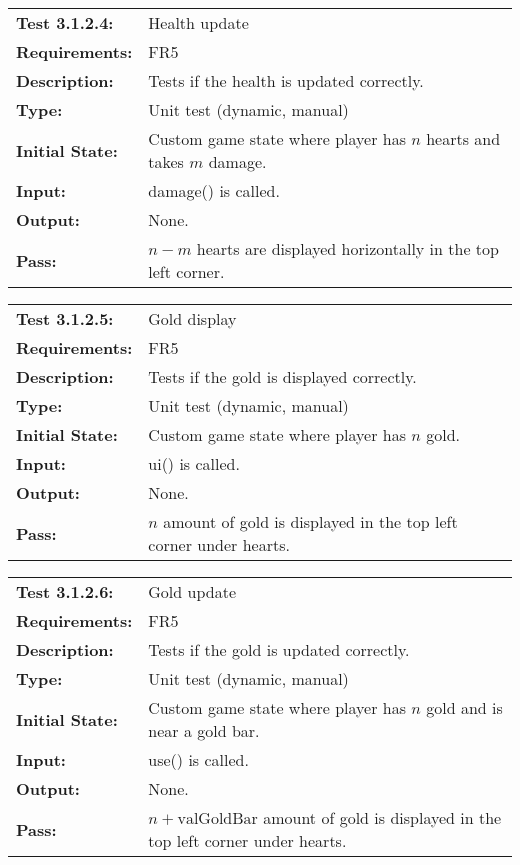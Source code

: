 \documentclass[12pt, titlepage]{article}
\begin{document}
\begin{tabular}{|l|p{10cm}|}
    \hline
    \bf{Test} 3.1.2.4: & Health update \\
    \bf{Requirements}: & FR5 \\
    \bf{Description}: & Tests if the health is updated correctly. \\
    \bf{Type}: & Unit test (dynamic, manual) \\
    \bf{Initial State}: & Custom game state where player has $n$ hearts and takes $m$ damage. \\
    \bf{Input}: & damage() is called. \\
    \bf{Output}: & None. \\
    \bf{Pass}: & $n - m$ hearts are displayed horizontally in the top left corner. \\
    \hline
\end{tabular}

\begin{tabular}{|l|p{10cm}|}
    \hline
    \bf{Test} 3.1.2.5: & Gold display \\
    \bf{Requirements}: & FR5 \\
    \bf{Description}: & Tests if the gold is displayed correctly. \\
    \bf{Type}: & Unit test (dynamic, manual) \\
    \bf{Initial State}: & Custom game state where player has $n$ gold. \\
    \bf{Input}: & ui() is called. \\
    \bf{Output}: & None. \\
    \bf{Pass}: & $n$ amount of gold is displayed in the top left corner under hearts. \\
    \hline
\end{tabular}

\begin{tabular}{|l|p{10cm}|}
    \hline
    \bf{Test} 3.1.2.6: & Gold update \\
    \bf{Requirements}: & FR5 \\
    \bf{Description}: & Tests if the gold is updated correctly. \\
    \bf{Type}: & Unit test (dynamic, manual) \\
    \bf{Initial State}: & Custom game state where player has $n$ gold and is near a gold bar. \\
    \bf{Input}: & use() is called. \\
    \bf{Output}: & None. \\
    \bf{Pass}: & $n + \text{valGoldBar}$ amount of gold is displayed in the top left corner under hearts. \\
    \hline
\end{tabular}
\end{document}

